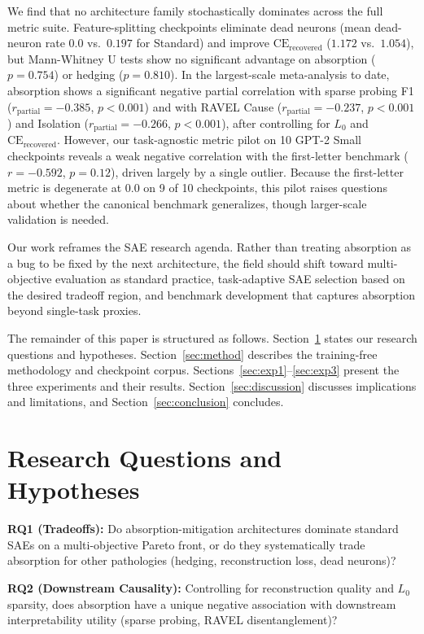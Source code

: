 \documentclass{article}
\begin{document}
We find that no architecture family stochastically dominates across the full metric suite. Feature-splitting checkpoints eliminate dead neurons (mean dead-neuron rate $0.0$ vs.~$0.197$ for Standard) and improve $\text{CE}_{\text{recovered}}$ ($1.172$ vs.~$1.054$), but Mann-Whitney U tests show no significant advantage on absorption ($p = 0.754$) or hedging ($p = 0.810$). In the largest-scale meta-analysis to date, absorption shows a significant negative partial correlation with sparse probing F1 ($r_{\text{partial}} = -0.385$, $p < 0.001$) and with RAVEL Cause ($r_{\text{partial}} = -0.237$, $p < 0.001$) and Isolation ($r_{\text{partial}} = -0.266$, $p < 0.001$), after controlling for $L_0$ and $\text{CE}_{\text{recovered}}$. However, our task-agnostic metric pilot on 10 GPT-2 Small checkpoints reveals a weak negative correlation with the first-letter benchmark ($r = -0.592$, $p = 0.12$), driven largely by a single outlier. Because the first-letter metric is degenerate at $0.0$ on 9 of 10 checkpoints, this pilot raises questions about whether the canonical benchmark generalizes, though larger-scale validation is needed.

Our work reframes the SAE research agenda. Rather than treating absorption as a bug to be fixed by the next architecture, the field should shift toward multi-objective evaluation as standard practice, task-adaptive SAE selection based on the desired tradeoff region, and benchmark development that captures absorption beyond single-task proxies.

The remainder of this paper is structured as follows. Section~\ref{sec:rqs} states our research questions and hypotheses. Section~\ref{sec:method} describes the training-free methodology and checkpoint corpus. Sections~\ref{sec:exp1}--\ref{sec:exp3} present the three experiments and their results. Section~\ref{sec:discussion} discusses implications and limitations, and Section~\ref{sec:conclusion} concludes.

\section{Research Questions and Hypotheses}
\label{sec:rqs}

\textbf{RQ1 (Tradeoffs):} Do absorption-mitigation architectures dominate standard SAEs on a multi-objective Pareto front, or do they systematically trade absorption for other pathologies (hedging, reconstruction loss, dead neurons)?

\textbf{RQ2 (Downstream Causality):} Controlling for reconstruction quality and $L_0$ sparsity, does absorption have a unique negative association with downstream interpretability utility (sparse probing, RAVEL disentanglement)?
\end{document}
